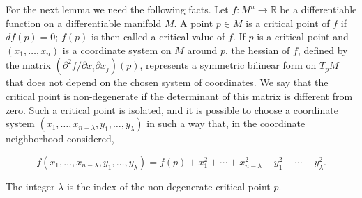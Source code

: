 For the next lemma we need the following facts. Let $f:M^n\to\mathbb{R}$ be a
differentiable function on a differentiable manifold $M$. A point $p\in M$ is a
critical point of $f$ if $df(p)=0$; $f(p)$ is then called a critical value of $f$.
If $p$ is a critical point and $(x_1,\dots,x_n)$ is a coordinate system on $M$
around $p$, the hessian of $f$, defined by the matrix
$(\partial^2f/\partial x_i\partial x_j)(p)$, represents a symmetric bilinear form
on $T_pM$ that does not depend on the chosen system of coordinates. We say that
the critical point is non-degenerate if the determinant of this matrix is
different from zero. Such a critical point is isolated, and it is possible to
choose a coordinate system $(x_1,\dots,x_{n-\lambda},y_1,\dots,y_\lambda)$ in such
a way that, in the coordinate neighborhood considered,

$$
f(x_1,\dots,x_{n-\lambda},y_1,\dots,y_\lambda)
=f(p)+x_1^2+\cdots+x_{n-\lambda}^2-y_1^2-\cdots-y_\lambda^2.
$$

The integer $\lambda$ is the index of the non-degenerate critical point $p$.

